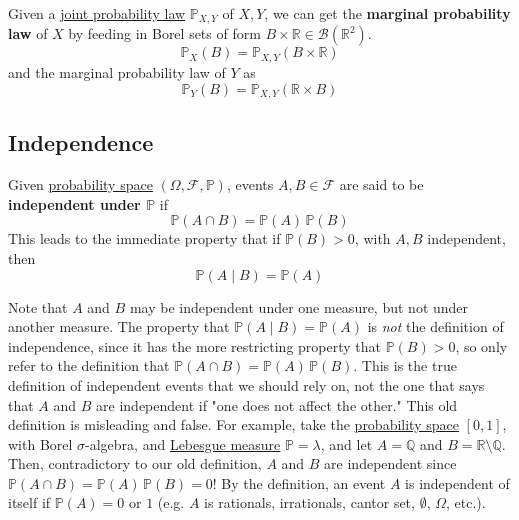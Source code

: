  \begin{definition}
    \label{def:marginal-probability-law}
    Given a \hyperref[def:joint-probability-law]{joint probability law} $\mathbb{P}_{X, Y}$ of $X, Y$, we can get the \textbf{marginal probability law} of $X$ by feeding in Borel sets of form $B \times \mathbb{R} \in \mathcal{B}(\mathbb{R}^2)$. 
    \begin{equation}
      \mathbb{P}_X (B) = \mathbb{P}_{X, Y} (B \times \mathbb{R})
    \end{equation}
    and the marginal probability law of $Y$ as 
    \begin{equation}
      \mathbb{P}_Y (B) = \mathbb{P}_{X, Y} (\mathbb{R} \times B)
    \end{equation}
  \end{definition}

\subsection{Independence}

  \begin{definition}
    \label{def:independence-of-2-events}
    Given \hyperref[def:probability-space]{probability space} $(\Omega, \mathcal{F}, \mathbb{P})$, events $A, B \in \mathcal{F}$ are said to be \textbf{independent under $\mathbb{P}$} if 
    \begin{equation}
      \mathbb{P}(A \cap B) = \mathbb{P}(A) \, \mathbb{P}(B)
    \end{equation}
    This leads to the immediate property that if $\mathbb{P}(B) > 0$, with $A, B$ independent, then 
    \begin{equation}
      \mathbb{P}(A \mid B) = \mathbb{P}(A)
    \end{equation}
  \end{definition}

  Note that $A$ and $B$ may be independent under one measure, but not under another measure. The property that $\mathbb{P}(A \mid B) = \mathbb{P}(A)$ is \textit{not} the definition of independence, since it has the more restricting property that $\mathbb{P}(B) > 0$, so only refer to the definition that $\mathbb{P}(A \cap B) = \mathbb{P}(A) \, \mathbb{P}(B)$. This is the true definition of independent events that we should rely on, not the one that says that $A$ and $B$ are independent if "one does not affect the other." This old definition is misleading and false. For example, take the \hyperref[def:probability-space]{probability space} $[0, 1]$, with Borel $\sigma$-algebra, and \hyperref[mt-def:lebesgue-measure]{Lebesgue measure} $\mathbb{P} = \lambda$, and let $A = \mathbb{Q}$ and $B = \mathbb{R} \setminus \mathbb{Q}$. Then, contradictory to our old definition, $A$ and $B$ are independent since $\mathbb{P}(A \cap B) = \mathbb{P}(A) \, \mathbb{P}(B) = 0$! By the definition, an event $A$ is independent of itself if $\mathbb{P}(A) = 0$ or $1$ (e.g. $A$ is rationals, irrationals, cantor set, $\emptyset$, $\Omega$, etc.). 


